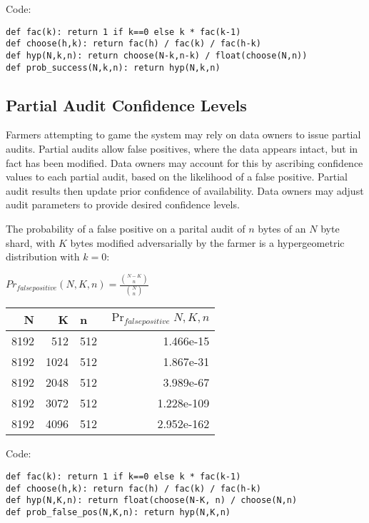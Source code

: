 \documentclass[a4paper,10pt]{article}
\begin{document}
Code:
\begin{lstlisting}
def fac(k): return 1 if k==0 else k * fac(k-1)
def choose(h,k): return fac(h) / fac(k) / fac(h-k)
def hyp(N,k,n): return choose(N-k,n-k) / float(choose(N,n))
def prob_success(N,k,n): return hyp(N,k,n)
\end{lstlisting}

\subsection{Partial Audit Confidence Levels}
Farmers attempting to game the system may rely on data owners to issue partial audits. Partial audits allow false positives, where the data appears intact, but in fact has been modified. Data owners may account for this by ascribing confidence values to each partial audit, based on the likelihood of a false positive. Partial audit results then update prior confidence of availability. Data owners may adjust audit parameters to provide desired confidence levels.

The probability of a false positive on a parital audit of $ n $ bytes of an $ N $ byte shard, with $ K $ bytes modified adversarially by the farmer is a hypergeometric distribution with $ k = 0 $:

{\centering
$Pr_{false positive}(N,K,n) = \displaystyle \frac{{N-K \choose n}} {{N \choose n}}$
\\}

\begin{table}[hbt!]
\begin{center}
\begin{tabular}{r r l r}
N & K & n & $\Pr_{falsepositive}{N,K,n}$\\
\hline 8192 & 512  & 512 & 1.466e-15\\
\hline 8192 & 1024 & 512 & 1.867e-31\\
\hline 8192 & 2048 & 512 & 3.989e-67\\
\hline 8192 & 3072 & 512 & 1.228e-109\\
\hline 8192 & 4096 & 512 & 2.952e-162\\
\end{tabular}
\end{center}
\end{table}

Code:
\begin{lstlisting}
def fac(k): return 1 if k==0 else k * fac(k-1)
def choose(h,k): return fac(h) / fac(k) / fac(h-k)
def hyp(N,K,n): return float(choose(N-K, n) / choose(N,n)
def prob_false_pos(N,K,n): return hyp(N,K,n)
\end{lstlisting}
\end{document}
